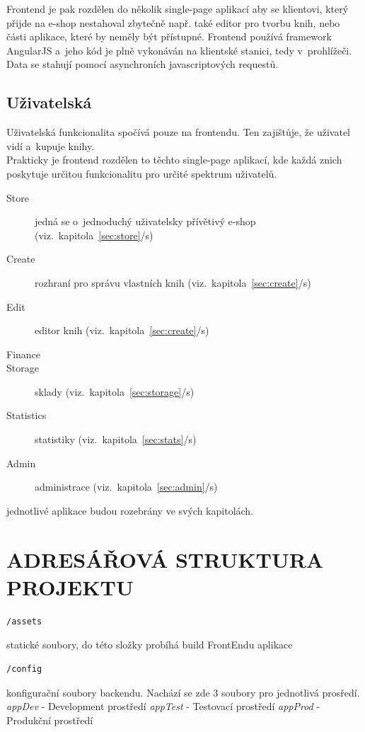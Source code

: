 \documentclass[a4paper,12pt,twoside,BCOR=10mm]{article}
\newcommand{\upc}[1]{\uppercase{#1}} %
\newcommand{\odkazNaKapitolu}[1]{(viz.~kapitola~\ref{#1}/s\pageref{#1})}
\renewcommand{\it}[1]{\textit{#1}}    %
\newenvironment{codeframe}{%
  \begin{Sbox} 
    \begin{minipage} 
      {\columnwidth-\leftmargin-\rightmargin-2\fboxsep-2\fboxrule-4pt} 
}{%

  \end{minipage} 
  \end{Sbox} 
  \begin{center} 
    \fcolorbox{black}{codeback}{\TheSbox} 
  \end{center} 
}
\begin{document}
Frontend je pak rozdělen do několik single-page aplikací aby se klientovi, který přijde na e-shop nestahoval zbytečně např. také editor pro tvorbu knih, nebo části aplikace, které by neměly být přístupné. Frontend používá framework AngularJS a~jeho kód je plně vykonáván na klientské stanici, tedy v~prohlížeči. Data se stahují pomocí asynchroních javascriptových requestů.\\

\subsection{Uživatelská}
Uživatelská funkcionalita spočívá pouze na frontendu. Ten zajištůje, že uživatel vidí a~kupuje knihy.\\

Prakticky je frontend rozdělen to těchto single-page aplikací, kde každá znich poskytuje určitou funkcionalitu pro určité spektrum uživatelů.\\

\begin{description}
 \item[Store] jedná se o~jednoduchý uživatelsky přívětivý e-shop \odkazNaKapitolu{sec:store}
 \item[Create] rozhraní pro správu vlastních knih \odkazNaKapitolu{sec:create}
 \item[Edit] editor knih \odkazNaKapitolu{sec:create}
 \item[Finance]
 \item[Storage] sklady \odkazNaKapitolu{sec:storage}
 \item[Statistics] statistiky \odkazNaKapitolu{sec:stats}
 \item[Admin] administrace \odkazNaKapitolu{sec:admin}
\end{description}

jednotlivé aplikace budou rozebrány ve svých kapitolách.

\section{\upc{Adresářová struktura projektu}}
\begin{codeframe}
  \begin{verbatim}
/assets
  \end{verbatim}
\end{codeframe}
statické soubory, do této složky probíhá build FrontEndu aplikace

\begin{codeframe}
  \begin{verbatim}
/config
  \end{verbatim}
\end{codeframe}
konfigurační soubory backendu. Nachází se zde 3 soubory pro jednotlivá prosředí.\newline
\it{appDev} - Development prostředí\newline
\it{appTest} - Testovací prostředí\newline
\it{appProd} - Produkční prostředí
\end{document}

